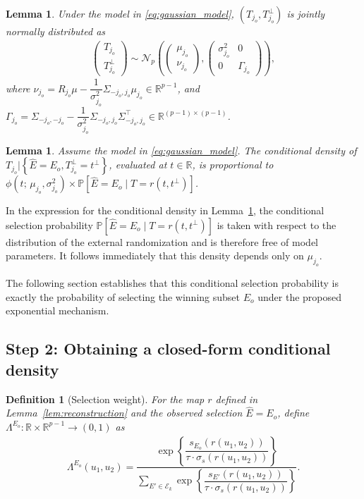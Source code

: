 \documentclass[12pt]{article}
\newcommand{\cbracket}[1]{\left\{ #1 \right\}}
\newtheorem{definition}{Definition}[section]
\newtheorem{lemma}[theorem]{Lemma}
\newcommand{\real}{\mathbb{R}}
\newcommand{\Pp}{{\mathbb{P}}}
\newcommand{\Ek}{\mathcal{E}_{k}}      %
\newcommand{\Ehat}{\widehat{E}}
\newcommand{\snoise}{\sigma_{s}}
\begin{document}
\begin{lemma}
\label{lem:decomp}
Under the model in \eqref{eq:gaussian_model}, $(T_{j_o}, T_{j_o}^\perp)$ is jointly normally distributed as
\begin{align}
  \label{eq:joint_gauss}
  \begin{pmatrix} T_{j_o} \\ T_{j_o}^\perp \end{pmatrix}
  \sim
  \mathcal{N}_p\!\left(
    \begin{pmatrix} \mu_{j_o} \\ \nu_{j_o} \end{pmatrix},
    \begin{pmatrix} \sigma_{j_o}^2 & 0 \\ 0 & \Gamma_{j_o}
    \end{pmatrix}
  \right),
\end{align}
where $\nu_{j_o}= R_{j_o} \mu
     - \dfrac{1}{\sigma_{j_o}^{2}}\Sigma_{-j_o,j_o} \mu_{j_o}
   \in \real^{p-1}$, and $\Gamma_{j_o}= \Sigma_{-j_o,-j_o}
     - \dfrac{1}{\sigma_{j_o}^{2}}\Sigma_{-j_o,j_o} \Sigma_{-j_o,j_o}^\top
   \in \real^{(p-1) \times (p-1)}$.
\end{lemma}


\begin{lemma}
Assume the model in \eqref{eq:gaussian_model}. 
The conditional density of $T_{j_o} \Big\lvert \cbracket{\Ehat = E_o, T_{j_o}^\perp = t^\perp}$, evaluated at $t\in \real$, is proportional to
$\phi(t;\, \mu_{j_o}, \sigma_{j_o}^2) \times \Pp[\Ehat=E_o \mid T = r(t, t^\perp)]$.
\label{lem:conditionaldensity}
\end{lemma}

In the expression for the conditional density in Lemma~\ref{lem:conditionaldensity}, the conditional selection probability $\Pp[\Ehat=E_o \mid T = r(t, t^\perp)]$ is taken with respect to the distribution of the external randomization and is therefore free of model parameters. 
It follows immediately that this density depends only on $\mu_{j_o}$.

The following section establishes that this conditional selection probability is exactly the probability of selecting the winning subset $E_o$ under the proposed exponential mechanism.

\subsection{Step 2: Obtaining a closed-form conditional density}

\begin{definition}[Selection weight]
\label{def:Lambda}
For the map $r$ defined in Lemma~\ref{lem:reconstruction} and the observed selection $\Ehat = E_o$, define $\Lambda^{E_o} : \real \times \real^{p-1} \to (0,1)$ as
\begin{align}
  \label{eq:Lambda}
  \Lambda^{E_o}(u_1, u_2)
  =
  \dfrac{
    \exp\!\left\{
      \dfrac{s_{E_o}(r(u_1,u_2))}
            {\tau \cdot \snoise(r(u_1,u_2))}
    \right\}
  }{
    \displaystyle\sum_{E' \in \Ek}
    \exp\!\left\{
      \dfrac{s_{E'}(r(u_1,u_2))}
            {\tau \cdot \snoise(r(u_1,u_2))}
    \right\}
  }.
\end{align}
\end{definition}
\end{document}
